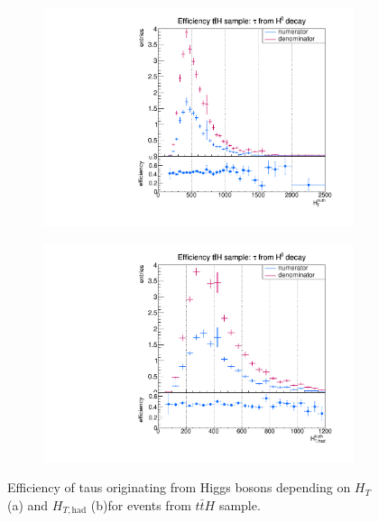 \begin{figure}
  \centering
                \begin{subfigure}[t]{0.49\textwidth}
                \includegraphics[width=\textwidth]{figures/plots/ttH/Divided_fromHHT.pdf}
                \label{Divided:fromH:HT}
                \end{subfigure}
                \begin{subfigure}[t]{0.49\textwidth}
                \includegraphics[width=\textwidth]{figures/plots/ttH/Divided_fromHHThad.pdf}
                \label{Divided:fromH:HThad}
                \end{subfigure}
\caption[Efficiency of taus originating from Higgs bosons for events from $t\bar{t}H$ sample.]{Efficiency of taus originating from Higgs bosons depending on $H_{T}$ (a) and $H_{T,\text{had}}$ (b)for events from $t\bar{t}H$ sample.}
\label{Divided:fromH:HTgedöns}
\end{figure}

